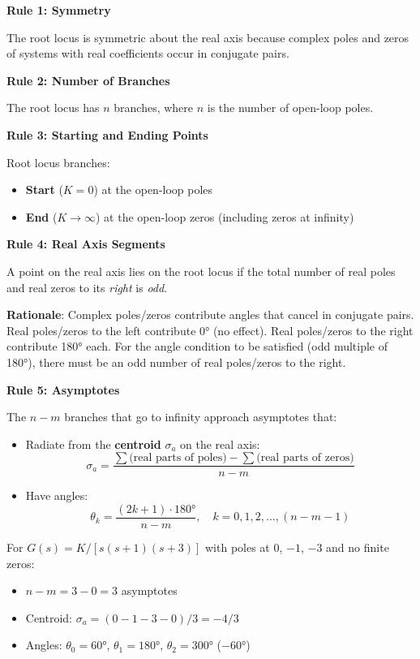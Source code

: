 \textbf{Rule 1: Symmetry}

The root locus is symmetric about the real axis because complex poles and zeros of systems with real coefficients occur in conjugate pairs.

\textbf{Rule 2: Number of Branches}

The root locus has $n$ branches, where $n$ is the number of open-loop poles.

\textbf{Rule 3: Starting and Ending Points}

Root locus branches:
\begin{itemize}
    \item \textbf{Start} ($K = 0$) at the open-loop poles
    \item \textbf{End} ($K \to \infty$) at the open-loop zeros (including zeros at infinity)
\end{itemize}

\textbf{Rule 4: Real Axis Segments}

A point on the real axis lies on the root locus if the total number of real poles and real zeros to its \textit{right} is \textit{odd}.

\textbf{Rationale}: Complex poles/zeros contribute angles that cancel in conjugate pairs. Real poles/zeros to the left contribute 0° (no effect). Real poles/zeros to the right contribute 180° each. For the angle condition to be satisfied (odd multiple of 180°), there must be an odd number of real poles/zeros to the right.

\textbf{Rule 5: Asymptotes}

The $n - m$ branches that go to infinity approach asymptotes that:
\begin{itemize}
    \item Radiate from the \textbf{centroid} $\sigma_a$ on the real axis:
    \begin{equation}
    \sigma_a = \frac{\sum \text{(real parts of poles)} - \sum \text{(real parts of zeros)}}{n - m}
    \end{equation}

    \item Have angles:
    \begin{equation}
    \theta_k = \frac{(2k + 1) \cdot 180°}{n - m}, \quad k = 0, 1, 2, \ldots, (n-m-1)
    \end{equation}
\end{itemize}

\begin{example}[Asymptotes]
For $G(s) = K/[s(s+1)(s+3)]$ with poles at 0, $-1$, $-3$ and no finite zeros:
\begin{itemize}
    \item $n - m = 3 - 0 = 3$ asymptotes
    \item Centroid: $\sigma_a = (0 - 1 - 3 - 0)/3 = -4/3$
    \item Angles: $\theta_0 = 60°$, $\theta_1 = 180°$, $\theta_2 = 300°$ ($-60°$)
\end{itemize}
\end{example}

